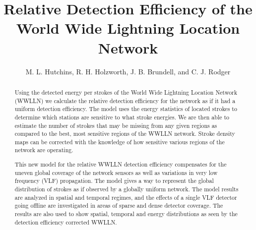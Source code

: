 \documentclass[draft,ras]{agutex}
\begin{document}
\title{Relative Detection Efficiency of the World Wide Lightning Location Network}

\author{M. L. Hutchins, R. H. Holzworth, J. B. Brundell, and C. J. Rodger}




\begin{abstract}

Using the detected energy per strokes of the World Wide Lightning Location Network (WWLLN) we calculate the relative detection efficiency for the network as if it had a uniform  detection efficiency. The model uses the energy statistics of located strokes to determine which stations are sensitive to what stroke energies. We are then able to estimate the number of strokes that may be missing from any given regions as compared to the best, most sensitive regions of the WWLLN network. Stroke density maps can be corrected with the knowledge of how sensitive various regions of the network are operating.

This new model for the relative WWLLN detection efficiency compensates for the uneven global coverage of the network sensors as well as variations in very low frequency (VLF) propagation. The model gives a way to represent the global distribution of strokes as if observed by a globally uniform network. The model results are analyzed in spatial and temporal regimes, and the effects of a single VLF detector going offline are investigated in areas of sparse and dense detector coverage. The results are also used to show spatial, temporal and energy distributions as seen by the detection efficiency corrected WWLLN.

\end{abstract}
\end{document}
